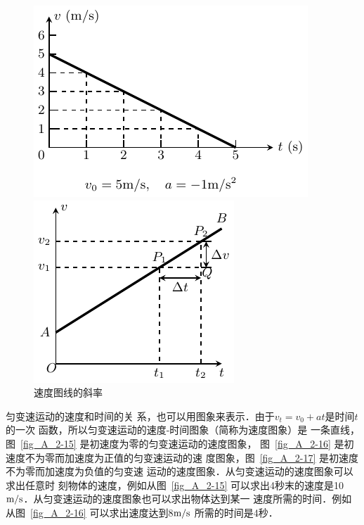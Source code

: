 \begin{figure}[htp]
    \centering
    \begin{minipage}[t]{0.48\textwidth}
        \centering
        \includegraphics{fig/A/2-17.pdf}
        \caption{}\label{fig_A_2-17}
    \end{minipage}
    \begin{minipage}[t]{0.48\textwidth}
        \centering
        \includegraphics{fig/A/2-18.pdf}
        \caption{速度图线的斜率}\label{fig_A_2-18}
    \end{minipage}
\end{figure}

匀变速运动的速度和时间的关
系，也可以用图象来表示．由于$v_t=v_0+at$是时间$t$的一次
函数，所以匀变速运动的速度-时间图象（简称为速度图象）是
一条直线，图~\ref{fig_A_2-15} 是初速度为零的匀变速运动的速度图象，
图~\ref{fig_A_2-16} 是初速度不为零而加速度为正值的匀变速运动的速
度图象，图~\ref{fig_A_2-17} 是初速度不为零而加速度为负值的匀变速
运动的速度图象．从匀变速运动的速度图象可以求出任意时
刻物体的速度，例如从图~\ref{fig_A_2-15} 可以求出4秒末的速度是10
$\text{m}/\text{s}$．从匀变速运动的速度图象也可以求出物体达到某一
速度所需的时间．例如从图~\ref{fig_A_2-16} 可以求出速度达到8$\text{m}/\text{s}$
所需的时间是4秒．


